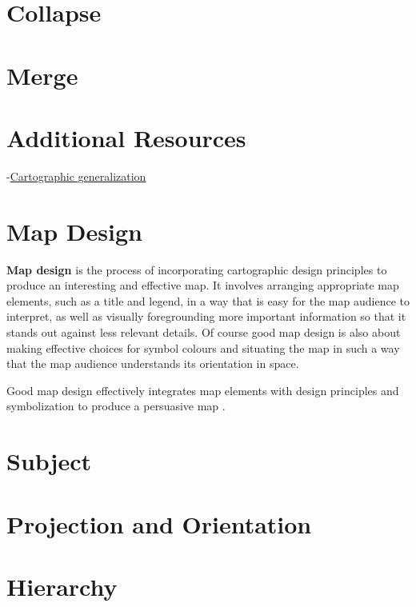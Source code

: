 \documentclass[
]{book}
\begin{document}
\hypertarget{collapse}{%
\section{Collapse}\label{collapse}}

\hypertarget{merge}{%
\section{Merge}\label{merge}}

\hypertarget{additional-resources-3}{%
\section{Additional Resources}\label{additional-resources-3}}

-\href{http://wiki.gis.com/wiki/index.php/Cartographic_generalization}{Cartographic generalization}

\hypertarget{map-design}{%
\section{Map Design}\label{map-design}}

\textbf{Map design} is the process of incorporating cartographic design principles to produce an interesting and effective map. It involves arranging appropriate map elements, such as a title and legend, in a way that is easy for the map audience to interpret, as well as visually foregrounding more important information so that it stands out against less relevant details. Of course good map design is also about making effective choices for symbol colours and situating the map in such a way that the map audience understands its orientation in space.

Good map design effectively integrates map elements with design principles and symbolization to produce a persuasive map \citep{deluca_design_2017}.

\hypertarget{subject}{%
\section{Subject}\label{subject}}

\hypertarget{projection-and-orientation}{%
\section{Projection and Orientation}\label{projection-and-orientation}}

\hypertarget{hierarchy}{%
\section{Hierarchy}\label{hierarchy}}
\end{document}
